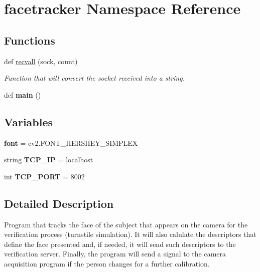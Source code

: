\hypertarget{namespacefacetracker}{}\section{facetracker Namespace Reference}
\label{namespacefacetracker}
\subsection*{Functions}
\begin{DoxyCompactItemize}
\item 
def \hyperlink{namespacefacetracker_aeaf86b8cbf5f4faf7756b29092ddbfe2}{recvall} (sock, count)
\begin{DoxyCompactList}\small\item\em Function that will convert the socket received into a string. \end{DoxyCompactList}\item 
def {\bfseries main} ()\hypertarget{namespacefacetracker_acffbe43cef12f89f6cf7902772ca9ee1}{}\label{namespacefacetracker_acffbe43cef12f89f6cf7902772ca9ee1}

\end{DoxyCompactItemize}
\subsection*{Variables}
\begin{DoxyCompactItemize}
\item 
{\bfseries font} = cv2.\+F\+O\+N\+T\+\_\+\+H\+E\+R\+S\+H\+E\+Y\+\_\+\+S\+I\+M\+P\+L\+EX\hypertarget{namespacefacetracker_af8f8c0f83a1bcab62b58ffe151d54257}{}\label{namespacefacetracker_af8f8c0f83a1bcab62b58ffe151d54257}

\item 
string {\bfseries T\+C\+P\+\_\+\+IP} = \textquotesingle{}localhost\textquotesingle{}\hypertarget{namespacefacetracker_a0d3f577882e0f8deade5722e75594b58}{}\label{namespacefacetracker_a0d3f577882e0f8deade5722e75594b58}

\item 
int {\bfseries T\+C\+P\+\_\+\+P\+O\+RT} = 8002\hypertarget{namespacefacetracker_a7fd84c2f2afecb14acb6526007adb04a}{}\label{namespacefacetracker_a7fd84c2f2afecb14acb6526007adb04a}

\end{DoxyCompactItemize}


\subsection{Detailed Description}
\begin{DoxyVerb}Program that tracks the face of the subject that appears on the camera for the verification process (turnstile simulation). 
It will also calulate the descriptors that define the face presented and, if needed, it will send such descriptors to the verification server.
Finally, the program will send a signal to the camera acquisition program if the person changes for a further calibration. 
\end{DoxyVerb}
 

